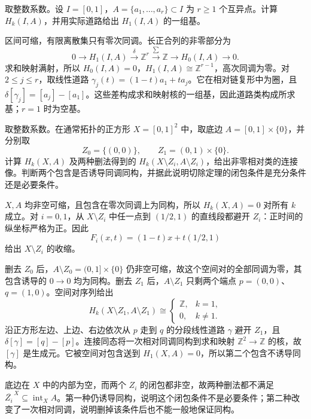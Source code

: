 \begin{exercise}\label{g2:ex:interval-many-marked-points}
	取整数系数。设 \(I=[0,1]\)，\(A=\{a_1,\ldots,a_r\}\subset I\) 为 \(r\ge1\) 个互异点。计算 \(H_k(I,A)\)，并用实际道路给出 \(H_1(I,A)\) 的一组基。
\end{exercise}
\begin{solution}
	区间可缩，有限离散集只有零次同调。长正合列的非零部分为
	\[
		0\longrightarrow H_1(I,A)\xrightarrow{\delta}
		\mathbb Z^r\xrightarrow{\sum}\mathbb Z
		\longrightarrow H_0(I,A)\longrightarrow0.
	\]
	求和映射满射，所以 \(H_0(I,A)=0\)，\(H_1(I,A)\cong\mathbb Z^{r-1}\)，高次同调为零。对 \(2\le j\le r\)，取线性道路 \(\gamma_j(t)=(1-t)a_1+ta_j\)。它在相对链复形中为圈，且 \(\delta[\gamma_j]=[a_j]-[a_1]\)。这些差构成求和映射核的一组基，因此道路类构成所求基；\(r=1\) 时为空基。
\end{solution}

\begin{exercise}\label{g2:ex:excision-closure-failure}
	取整数系数。在通常拓扑的正方形 \(X=[0,1]^2\) 中，取底边 \(A=[0,1]\times\{0\}\)，并分别取
	\[
		Z_0=\{(0,0)\},\qquad Z_1=(0,1)\times\{0\}.
	\]
	计算 \(H_k(X,A)\) 及两种删法得到的 \(H_k(X\setminus Z_i,A\setminus Z_i)\)，给出非零相对类的连接像。判断两个包含是否诱导同调同构，并据此说明切除定理的闭包条件是充分条件还是必要条件。
\end{exercise}
\begin{solution}
	\(X,A\) 均非空可缩，且包含在零次同调上为同构，所以 \(H_k(X,A)=0\) 对所有 \(k\) 成立。对 \(i=0,1\)，从 \(X\setminus Z_i\) 中任一点到 \((1/2,1)\) 的直线段都避开 \(Z_i\)：正时间的纵坐标严格为正。因此
	\[
		F_i(x,t)=(1-t)x+t(1/2,1)
	\]
	给出 \(X\setminus Z_i\) 的收缩。

	删去 \(Z_0\) 后，\(A\setminus Z_0=(0,1]\times\{0\}\) 仍非空可缩，故这个空间对的全部同调为零，其包含诱导的 \(0\to0\) 均为同构。删去 \(Z_1\) 后，\(A\setminus Z_1\) 只剩两个端点 \(p=(0,0)\)、\(q=(1,0)\)。空间对序列给出
	\[
		H_k(X\setminus Z_1,A\setminus Z_1)\cong
		\begin{cases}
			\mathbb Z,&k=1,\\
			0,&k\ne1.
		\end{cases}
	\]
	沿正方形左边、上边、右边依次从 \(p\) 走到 \(q\) 的分段线性道路 \(\gamma\) 避开 \(Z_1\)，且 \(\delta[\gamma]=[q]-[p]\)。连接同态将一次相对同调同构到求和映射 \(\mathbb Z^2\to\mathbb Z\) 的核，故 \([\gamma]\) 是生成元。它被空间对包含送到 \(H_1(X,A)=0\)，所以第二个包含不诱导同构。

	底边在 \(X\) 中的内部为空，而两个 \(Z_i\) 的闭包都非空，故两种删法都不满足 \(\overline{Z_i}^{\,X}\subseteq\operatorname{int}_X A\)。第一种仍诱导同构，说明这个闭包条件不是必要条件；第二种改变了一次相对同调，说明删掉该条件后也不能一般地保证同构。
\end{solution}

